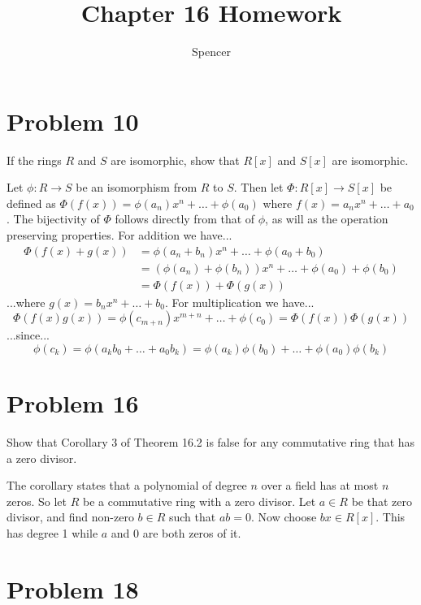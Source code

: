 \documentclass{article}
\title{Chapter 16 Homework}
\author{Spencer}
\begin{document}
\maketitle

\newcommand{\Z}{\mathbb{Z}}
\newcommand{\R}{\mathbb{R}}
\newcommand{\N}{\mathbb{N}}
\newcommand{\Q}{\mathbb{Q}}
\newcommand{\lcm}{\mbox{lcm}}

\section*{Problem 10}

If the rings $R$ and $S$ are isomorphic, show that $R[x]$ and $S[x]$
are isomorphic.

Let $\phi:R\to S$ be an isomorphism from $R$ to $S$.
Then let $\Phi:R[x]\to S[x]$ be defined as
$\Phi(f(x))=\phi(a_n)x^n+\dots+\phi(a_0)$
where $f(x)=a_nx^n+\dots+a_0$.  The bijectivity of
$\Phi$ follows directly from that of $\phi$, as will as the operation
preserving properties.  For addition we have...
\begin{align*}
\Phi(f(x)+g(x))&=\phi(a_n+b_n)x^n+\dots+\phi(a_0+b_0) \\
 &= (\phi(a_n)+\phi(b_n))x^n+\dots+\phi(a_0)+\phi(b_0) \\
 &= \Phi(f(x))+\Phi(g(x))
\end{align*}
...where $g(x)=b_nx^n+\dots+b_0$.  For multiplication we have...
\begin{equation*}
\Phi(f(x)g(x))=\phi(c_{m+n})x^{m+n}+\dots+\phi(c_0)=\Phi(f(x))\Phi(g(x))
\end{equation*}
...since...
\begin{equation*}
\phi(c_k)=\phi(a_kb_0+\dots+a_0b_k)=\phi(a_k)\phi(b_0)+\dots+\phi(a_0)\phi(b_k)
\end{equation*}

\section*{Problem 16}

Show that Corollary 3 of Theorem 16.2 is false for any commutative ring that
has a zero divisor.

The corollary states that a polynomial of degree $n$ over a field
has at most $n$ zeros.
So let $R$ be a commutative ring with a zero divisor.  Let $a\in R$
be that zero divisor, and find non-zero $b\in R$ such that $ab=0$.
Now choose $bx\in R[x]$.  This has degree 1 while $a$ and $0$
are both zeros of it.

\section*{Problem 18}
\end{document}
